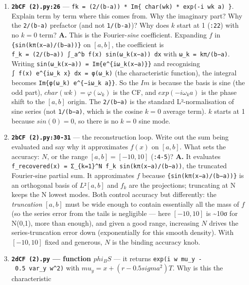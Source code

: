\documentclass[
  11pt,
]{article}
\begin{document}
\begin{enumerate}
\def\labelenumi{\arabic{enumi}.}
\item
  \textbf{\texttt{2bCF\ (2).py:26}} ---
  \texttt{fk\ =\ (2/(b-a))\ *\ Im\{\ char(wk)\ *\ exp(-i\ wk\ a)\ \}}.
  Explain term by term where this comes from. Why the imaginary part?
  Why the \texttt{2/(b-a)} prefactor (and not \texttt{1/(b-a)})? Why
  does \(k\) start at 1 (\texttt{:22}) with no \(k=0\) term? \textbf{A.}
  This is the Fourier-\emph{sine} coefficient. Expanding \(f\) in
  \texttt{\{sin(kπ(x−a)/(b−a))\}} on \([a,b]\), the coefficient is
  \texttt{f\_k\ =\ (2/(b−a))\ ∫\_a\^{}b\ f(x)\ sin(ω\_k(x−a))\ dx} with
  \texttt{ω\_k\ =\ kπ/(b−a)}. Writing
  \texttt{sin(ω\_k(x−a))\ =\ Im\{e\^{}\{iω\_k(x−a)\}\}} and recognising
  \texttt{∫\ f(x)\ e\^{}\{iω\_k\ x\}\ dx\ =\ φ(ω\_k)} (the
  characteristic function), the integral becomes
  \texttt{Im\{φ(ω\_k)\ e\^{}\{−iω\_k\ a\}\}}. So the \(Im\) is because
  the basis is sine (the odd part), \(char(wk)=φ(ω_k)\) is the CF, and
  \(exp(−i ω_k a)\) is the phase shift to the \([a,b]\) origin. The
  \texttt{2/(b−a)} is the standard L²-normalisation of sine series (not
  \texttt{1/(b−a)}, which is the cosine \(k=0\) average term). \(k\)
  starts at 1 because \(sin(0)=0\), so there is no \(k=0\) sine mode.
\item
  \textbf{\texttt{2bCF\ (2).py:30-31}} --- the reconstruction loop.
  Write out the sum being evaluated and say why it approximates \(f(x)\)
  on \([a,b]\). What sets the accuracy: \(N\), or the range
  \([a,b]=[-10,10]\) (\texttt{:4-5})? \textbf{A.} It evaluates
  \texttt{f\_recovered(x)\ =\ Σ\_\{k=1\}\^{}N\ f\_k\ sin(kπ(x−a)/(b−a))},
  the truncated Fourier-sine partial sum. It approximates \(f\) because
  \texttt{\{sin(kπ(x−a)/(b−a))\}} is an orthogonal basis of \(L²[a,b]\)
  and \(f_k\) are the projections; truncating at N keeps the N lowest
  modes. Both control accuracy but differently: the \emph{truncation}
  \([a,b]\) must be wide enough to contain essentially all the mass of
  \(f\) (so the series error from the tails is negligible --- here
  \([−10,10]\) is \textasciitilde10σ for N(0,1), more than enough), and
  given a good range, increasing \(N\) drives the series-truncation
  error down (exponentially for this smooth density). With \([−10,10]\)
  fixed and generous, \(N\) is the binding accuracy knob.
\item
  \textbf{\texttt{2dCF\ (2).py} --- function \(phi_BS\)} --- it returns
  \texttt{exp(i\ w\ mu\_y\ -\ 0.5\ var\_y\ w\^{}2)} with
  \(mu_y = x + (r - 0.5 sigma^2) T\). Why is this the characteristic

\end{enumerate}
\end{document}
